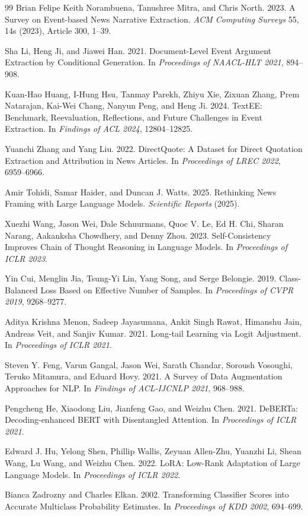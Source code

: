 \documentclass[sigconf,article,a4paper]{acmart}
\begin{document}
\begin{thebibliography}{99}
Brian Felipe Keith Norambuena, Tanushree Mitra, and Chris North. 2023.
A Survey on Event-based News Narrative Extraction.
\emph{ACM Computing Surveys} 55, 14s (2023), Article 300, 1--39.

Sha Li, Heng Ji, and Jiawei Han. 2021.
Document-Level Event Argument Extraction by Conditional Generation.
In \emph{Proceedings of NAACL-HLT 2021}, 894--908.

Kuan-Hao Huang, I-Hung Hsu, Tanmay Parekh, Zhiyu Xie, Zixuan Zhang, Prem
Natarajan, Kai-Wei Chang, Nanyun Peng, and Heng Ji. 2024.
TextEE: Benchmark, Reevaluation, Reflections, and Future Challenges in Event
Extraction. In \emph{Findings of ACL 2024}, 12804--12825.

Yuanchi Zhang and Yang Liu. 2022.
DirectQuote: A Dataset for Direct Quotation Extraction and Attribution in News
Articles. In \emph{Proceedings of LREC 2022}, 6959--6966.

Amir Tohidi, Samar Haider, and Duncan J. Watts. 2025.
Rethinking News Framing with Large Language Models.
\emph{Scientific Reports} (2025).

Xuezhi Wang, Jason Wei, Dale Schuurmans, Quoc V. Le, Ed H. Chi, Sharan
Narang, Aakanksha Chowdhery, and Denny Zhou. 2023.
Self-Consistency Improves Chain of Thought Reasoning in Language Models.
In \emph{Proceedings of ICLR 2023}.

Yin Cui, Menglin Jia, Tsung-Yi Lin, Yang Song, and Serge Belongie. 2019.
Class-Balanced Loss Based on Effective Number of Samples.
In \emph{Proceedings of CVPR 2019}, 9268--9277.

Aditya Krishna Menon, Sadeep Jayasumana, Ankit Singh Rawat, Himanshu Jain,
Andreas Veit, and Sanjiv Kumar. 2021.
Long-tail Learning via Logit Adjustment.
In \emph{Proceedings of ICLR 2021}.

Steven Y. Feng, Varun Gangal, Jason Wei, Sarath Chandar, Soroush Vosoughi,
Teruko Mitamura, and Eduard Hovy. 2021.
A Survey of Data Augmentation Approaches for NLP.
In \emph{Findings of ACL-IJCNLP 2021}, 968--988.

Pengcheng He, Xiaodong Liu, Jianfeng Gao, and Weizhu Chen. 2021.
DeBERTa: Decoding-enhanced BERT with Disentangled Attention.
In \emph{Proceedings of ICLR 2021}.

Edward J. Hu, Yelong Shen, Phillip Wallis, Zeyuan Allen-Zhu, Yuanzhi Li,
Shean Wang, Lu Wang, and Weizhu Chen. 2022.
LoRA: Low-Rank Adaptation of Large Language Models.
In \emph{Proceedings of ICLR 2022}.

Bianca Zadrozny and Charles Elkan. 2002.
Transforming Classifier Scores into Accurate Multiclass Probability Estimates.
In \emph{Proceedings of KDD 2002}, 694--699.

\end{thebibliography}
\end{document}
